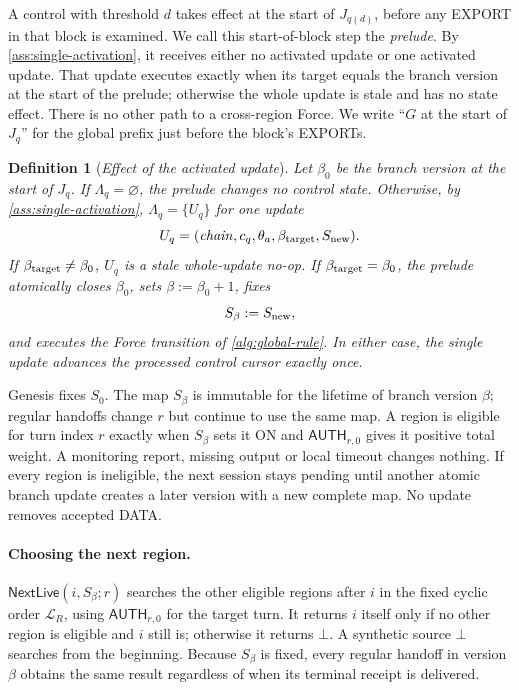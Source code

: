 \documentclass[11pt,a4paper]{article}
\newcommand{\tagg}[1]{\ensuremath{\mathsf{#1}}}
\newcommand{\defterm}[1]{\textcolor{rrBlue}{\textit{#1}}}
\newtheorem{definition}{Definition}[section]
\begin{document}
A control with threshold $d$ takes effect at the start of $J_{q(d)}$,
before any EXPORT in that block is examined. We call this start-of-block
step the \defterm{prelude}. By \cref{ass:single-activation}, it receives
either no activated update or one activated update. That update executes
exactly when its target equals the branch version at the start of the
prelude; otherwise the whole update is stale and has no state effect.
There is no other path to a cross-region Force. We write ``$G$ at the start of
$J_q$'' for the global prefix just before the block's EXPORTs.

\begin{definition}[\defterm{Effect of the activated update}]
\label{def:control-effect}
Let $\beta_0$ be the branch version at the start of $J_q$. If
$\Lambda_q=\varnothing$, the prelude changes no control state. Otherwise,
by \cref{ass:single-activation}, $\Lambda_q=\{U_q\}$ for one update
\[
 U_q=(\mathit{chain},c_q,\theta_a,\beta_{\rm target},S_{\rm new}).
\]
If $\beta_{\rm target}\ne\beta_0$, $U_q$ is a stale whole-update no-op.
If $\beta_{\rm target}=\beta_0$, the prelude atomically closes $\beta_0$,
sets $\beta:=\beta_0+1$, fixes
\[
 S_{\beta}:=S_{\rm new},
\]
and executes the Force transition of \cref{alg:global-rule}. In either
case, the single update advances the processed control cursor exactly
once.
\end{definition}

Genesis fixes $S_0$.  The map $S_\beta$ is immutable for the lifetime of
branch version $\beta$; regular handoffs change $r$ but continue to use
the same map.  A region is eligible for turn index $r$ exactly when
$S_\beta$ sets it ON and $\tagg{AUTH}_{r,0}$ gives it positive total
weight. A monitoring report, missing output or local timeout changes
nothing.  If every region is ineligible, the next session stays pending
until another atomic branch update creates a later version with a new
complete map.  No update removes accepted DATA.

\paragraph{Choosing the next region.}
$\tagg{NextLive}(i,S_\beta;r)$ searches the other eligible regions after
$i$ in the fixed cyclic order $\mathcal L_R$, using
$\tagg{AUTH}_{r,0}$ for the target turn.  It returns $i$ itself only if
no other region is eligible and $i$ still is; otherwise it returns
$\bot$.  A synthetic source $\bot$ searches from the beginning.  Because
$S_\beta$ is fixed, every regular handoff in version $\beta$ obtains the
same result regardless of when its terminal receipt is delivered.
\end{document}
